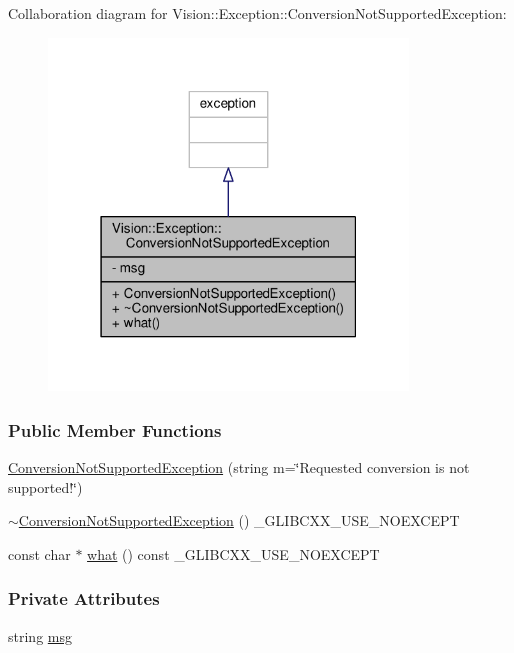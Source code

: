 Collaboration diagram for Vision\+:\+:Exception\+:\+:Conversion\+Not\+Supported\+Exception\+:
\nopagebreak
\begin{figure}[H]
\begin{center}
\leavevmode
\includegraphics[width=271pt]{class_vision_1_1_exception_1_1_conversion_not_supported_exception__coll__graph}
\end{center}
\end{figure}
\subsubsection*{Public Member Functions}
\begin{DoxyCompactItemize}
\item 
\hyperlink{class_vision_1_1_exception_1_1_conversion_not_supported_exception_a34e253638a4c162ae5167caa24b291be}{Conversion\+Not\+Supported\+Exception} (string m=\char`\"{}Requested conversion is not supported!\char`\"{})
\item 
\hyperlink{class_vision_1_1_exception_1_1_conversion_not_supported_exception_a84a70ce59ae2c3c0e5482875b8fe502e}{$\sim$\+Conversion\+Not\+Supported\+Exception} () \+\_\+\+G\+L\+I\+B\+C\+X\+X\+\_\+\+U\+S\+E\+\_\+\+N\+O\+E\+X\+C\+E\+P\+T
\item 
const char $\ast$ \hyperlink{class_vision_1_1_exception_1_1_conversion_not_supported_exception_a1a19cac0a67a7db2e187aac55b06e4c2}{what} () const \+\_\+\+G\+L\+I\+B\+C\+X\+X\+\_\+\+U\+S\+E\+\_\+\+N\+O\+E\+X\+C\+E\+P\+T
\end{DoxyCompactItemize}
\subsubsection*{Private Attributes}
\begin{DoxyCompactItemize}
\item 
string \hyperlink{class_vision_1_1_exception_1_1_conversion_not_supported_exception_a1cd5dd7edfb67cf5055374402b846daa}{msg}
\end{DoxyCompactItemize}


